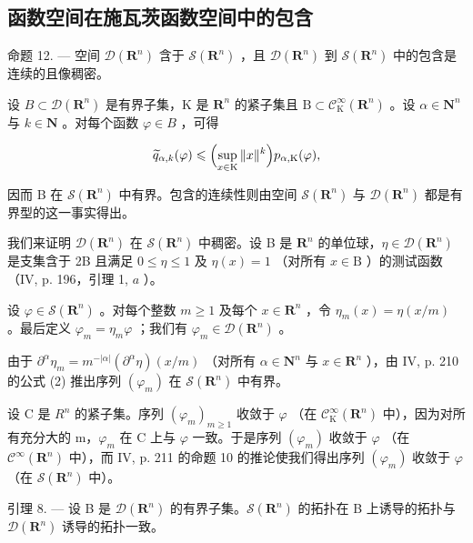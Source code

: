 \subsection{函数空间在施瓦茨函数空间中的包含}

命题 12. — 空间 \(\mathcal{D}(\mathbf{R}^{n})\) 含于 \(\mathcal{S}(\mathbf{R}^{n})\) ，且 \(\mathcal{D}(\mathbf{R}^{n})\) 到 \(\mathcal{S}(\mathbf{R}^{n})\) 中的包含是连续的且像稠密。

设 \(B \subset \mathcal{D}(\mathbf{R}^{n})\) 是有界子集，K 是 \(\mathbf{R}^{n}\) 的紧子集且 \(\mathrm{B} \subset \mathcal{C}_{\mathrm{K}}^{\infty}(\mathbf{R}^{n})\) 。设 \(\alpha \in \mathbf{N}^{n}\) 与 \(k \in \mathbf{N}\) 。对每个函数 \(\varphi \in B\) ，可得

\[
\widetilde {q} _ {\alpha , k} (\varphi) \leqslant \Bigl (\sup _ {x \in \mathrm{K}} \| x \| ^ {k} \Bigr) p _ {\alpha , \mathrm{K}} (\varphi),
\]

因而 B 在 \(\mathcal{S}(\mathbf{R}^{n})\) 中有界。包含的连续性则由空间 \(\mathcal{S}(\mathbf{R}^{n})\) 与 \(\mathcal{D}(\mathbf{R}^{n})\) 都是有界型的这一事实得出。

我们来证明 \(\mathcal{D}(\mathbf{R}^n)\) 在 \(\mathcal{S}(\mathbf{R}^n)\) 中稠密。设 B 是 \(\mathbf{R}^n\) 的单位球，\(\eta \in \mathcal{D}(\mathbf{R}^n)\) 是支集含于 2B 且满足 \(0 \leqslant \eta \leqslant 1\) 及 \(\eta(x) = 1\) （对所有 \(x \in \mathrm{B}\) ）的测试函数（IV, p. 196，引理 1, \(a\) ）。

设 \(\varphi \in \mathcal{S}(\mathbf{R}^n)\) 。对每个整数 \(m \geqslant 1\) 及每个 \(x \in \mathbf{R}^n\) ，令 \(\eta_m(x) = \eta(x/m)\) 。最后定义 \(\varphi_m = \eta_m\varphi\) ；我们有 \(\varphi_m \in \mathcal{D}(\mathbf{R}^n)\) 。

由于 \(\partial^{\alpha}\eta_{m} = m^{-|\alpha|}(\partial^{\alpha}\eta)(x / m)\) （对所有 \(\alpha \in \mathbf{N}^{n}\) 与 \(x\in \mathbf{R}^n\) ），由 IV, p. 210 的公式 (2) 推出序列 \((\varphi_{m})\) 在 \(\mathcal{S}(\mathbf{R}^n)\) 中有界。

设 C 是 \(R^{n}\) 的紧子集。序列 \((\varphi_{m})_{m\geqslant1}\) 收敛于 \(\varphi\) （在 \(\mathcal{C}_{\mathrm{K}}^{\infty}(\mathbf{R}^{n})\) 中），因为对所有充分大的 m，\(\varphi_{m}\) 在 C 上与 \(\varphi\) 一致。于是序列 \((\varphi_{m})\) 收敛于 \(\varphi\) （在 \(\mathcal{C}^{\infty}(\mathbf{R}^{n})\) 中），而 IV, p. 211 的命题 10 的推论使我们得出序列 \((\varphi_{m})\) 收敛于 \(\varphi\) （在 \(\mathcal{S}(\mathbf{R}^{n})\) 中）。

引理 8. --- 设 B 是 \(\mathcal{D}(\mathbf{R}^{n})\) 的有界子集。\(\mathcal{S}(\mathbf{R}^{n})\) 的拓扑在 B 上诱导的拓扑与 \(\mathcal{D}(\mathbf{R}^{n})\) 诱导的拓扑一致。

